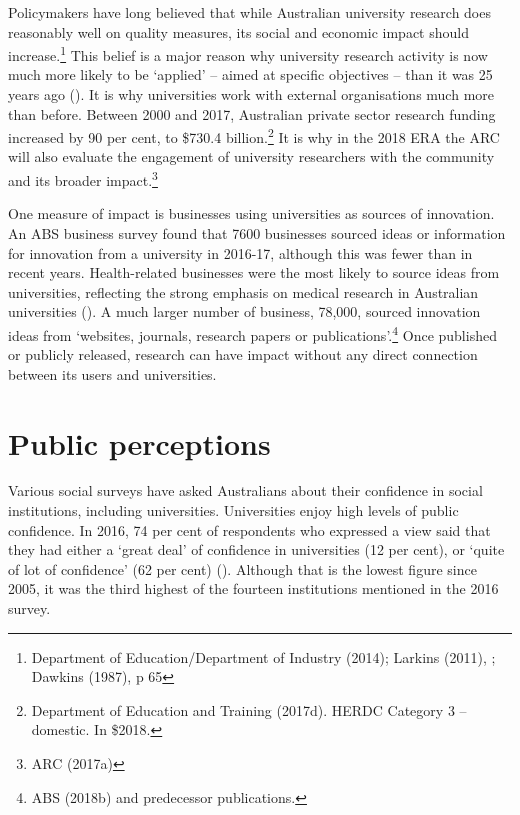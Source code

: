 \documentclass{grattan}
\begin{document}
Policymakers have long believed that while Australian university research does reasonably well on quality measures, its social and economic impact should increase.\footnote{Department of Education/Department of Industry (2014); Larkins (2011), ; Dawkins (1987), p 65} This belief is a major reason why university research activity is now much more likely to be `applied' -- aimed at specific objectives -- than it was 25 years ago (). It is why universities work with external organisations much more than before. Between 2000 and 2017, Australian private sector research funding increased by 90 per cent, to \$730.4 billion.\footnote{Department of Education and Training (2017d). HERDC Category 3 -- domestic. In \$2018.} It is why in the 2018 ERA the ARC will also evaluate the engagement of university researchers with the community and its broader impact.\footnote{ARC (2017a)}

One measure of impact is businesses using universities as sources of innovation. An ABS business survey found that 7600 businesses sourced ideas or information for innovation from a university in 2016-17, although this was fewer than in recent years. Health-related businesses were the most likely to source ideas from universities, reflecting the strong emphasis on medical research in Australian universities (). A much larger number of business, 78,000, sourced innovation ideas from `websites, journals, research papers or publications'.\footnote{ABS (2018b) and predecessor publications.} Once published or publicly released, research can have impact without any direct connection between its users and universities.

%
\section{Public perceptions}\label{sec:public-perceptions}

Various social surveys have asked Australians about their confidence in social institutions, including universities. Universities enjoy high levels of public confidence. In 2016, 74 per cent of respondents who expressed a view said that they had either a `great deal' of confidence in universities (12 per cent), or `quite of lot of confidence' (62 per cent) (). Although that is the lowest figure since 2005, it was the third highest of the fourteen institutions mentioned in the 2016 survey.
\end{document}
